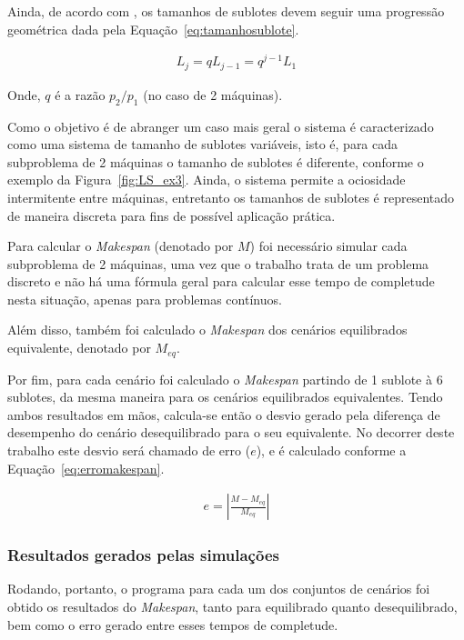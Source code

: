     Ainda, de acordo com , os tamanhos de sublotes devem seguir uma progressão geométrica dada pela Equação~\ref{eq:tamanhosublote}. 
    
    \begin{eqnarray}
        L _ { j } = q L _ { j - 1 } = q ^ { j - 1 } L _ { 1 }
        \label{eq:tamanhosublote}
    \end{eqnarray}
    
    Onde, $q$ é a razão $p_2/p_1$ (no caso de 2 máquinas).
    
    Como o objetivo é de abranger um caso mais geral o sistema é caracterizado como uma sistema de tamanho de sublotes variáveis, isto é, para cada subproblema de 2 máquinas o tamanho de sublotes é diferente, conforme o exemplo da Figura~\ref{fig:LS_ex3}. Ainda, o sistema permite a ociosidade intermitente entre máquinas, entretanto os tamanhos de sublotes é representado de maneira discreta para fins de possível aplicação prática. 
    
    Para calcular o \textit{Makespan} (denotado por $M$) foi necessário simular cada subproblema de 2 máquinas, uma vez que o trabalho trata de um problema discreto e não há uma fórmula geral para calcular esse tempo de completude nesta situação, apenas para problemas contínuos.
    
    Além disso, também foi calculado o \textit{Makespan} dos cenários equilibrados equivalente, denotado por $M_{eq}$.
    
    Por fim, para cada cenário foi calculado o \textit{Makespan} partindo de 1 sublote à 6 sublotes, da mesma maneira para os cenários equilibrados equivalentes. Tendo ambos resultados em mãos, calcula-se então o desvio gerado pela diferença de desempenho do cenário desequilibrado para o seu equivalente. No decorrer deste trabalho este desvio será chamado de erro ($e$), e é calculado conforme a Equação~\ref{eq:erromakespan}.
    
    \begin{eqnarray}
        e = \left|\frac{M - M_{eq}}{M_{eq}}\right|
        \label{eq:erromakespan}
    \end{eqnarray}
    
    
    \subsubsection{Resultados gerados pelas simulações}
    
    Rodando, portanto, o programa para cada um dos conjuntos de cenários foi obtido os resultados do \textit{Makespan}, tanto para equilibrado quanto desequilibrado, bem como o erro gerado entre esses tempos de completude. 
    
